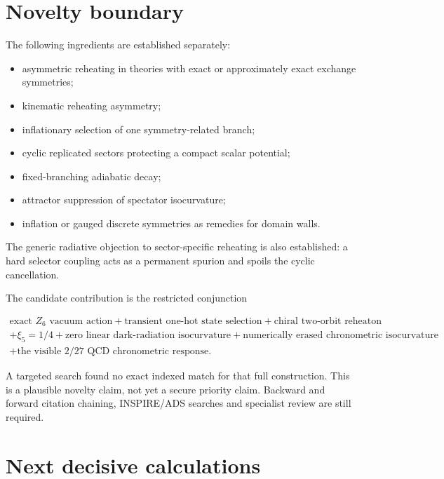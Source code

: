\documentclass[
  10pt,
]{article}
\providecommand{\tightlist}{%
  \setlength{\itemsep}{0pt}\setlength{\parskip}{0pt}}
\begin{document}
\section{Novelty boundary}\label{novelty-boundary}

The following ingredients are established separately:

\begin{itemize}
\tightlist
\item
  asymmetric reheating in theories with exact or approximately exact
  exchange symmetries;
\item
  kinematic reheating asymmetry;
\item
  inflationary selection of one symmetry-related branch;
\item
  cyclic replicated sectors protecting a compact scalar potential;
\item
  fixed-branching adiabatic decay;
\item
  attractor suppression of spectator isocurvature;
\item
  inflation or gauged discrete symmetries as remedies for domain walls.
\end{itemize}

The generic radiative objection to sector-specific reheating is also
established: a hard selector coupling acts as a permanent spurion and
spoils the cyclic cancellation.

The candidate contribution is the restricted conjunction

\[
\boxed{
\begin{gathered}
\text{exact }Z_6\text{ vacuum action}
+
\text{transient one-hot state selection}
+
\text{chiral two-orbit reheaton}
\\
+
\xi_5=1/4
+
\text{zero linear dark-radiation isocurvature}
+
\text{numerically erased chronometric isocurvature}
\\
+
\text{the visible }2/27\text{ QCD chronometric response}.
\end{gathered}
}
\]

A targeted search found no exact indexed match for that full
construction. This is a plausible novelty claim, not yet a secure
priority claim. Backward and forward citation chaining, INSPIRE/ADS
searches and specialist review are still required.

\section{Next decisive calculations}\label{next-decisive-calculations}
\end{document}
